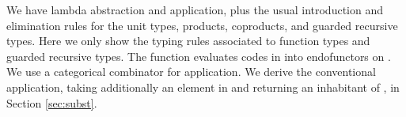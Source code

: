 \begin{AgdaAlign}
We have lambda abstraction and application, plus the usual
introduction and elimination rules for the unit types, products, 
coproducts, and guarded recursive types. Here we only show the typing rules associated to function types and guarded recursive types.
The function  evaluates codes in   into endofunctors on  .
We use a categorical combinator  for application.
We derive the conventional application, taking additionally an element
in    and returning an inhabitant of   , in Section \ref{sec:subst}.
\begin{code}%
%
\>[4]\AgdaSpace{}%
\AgdaSymbol{:}\AgdaSpace{}%
\AgdaSpace{}%
\AgdaSymbol{\{}\AgdaSymbol{\}}\AgdaSpace{}%
\AgdaSymbol{\{}\AgdaSpace{}%
\AgdaSymbol{:}\AgdaSpace{}%
\AgdaSpace{}%
\AgdaSymbol{\}}\AgdaSpace{}%
\AgdaSymbol{\{}\AgdaSpace{}%
\AgdaSpace{}%
\AgdaSymbol{:}\AgdaSpace{}%
\AgdaSpace{}%
\AgdaSymbol{\}}\AgdaSpace{}%
\AgdaSpace{}%
\AgdaSpace{}%
\AgdaSymbol{(}\AgdaSpace{}%
\AgdaOperator{\AgdaInductiveConstructor{,}}\AgdaSpace{}%
\AgdaSymbol{)}\AgdaSpace{}%
\AgdaSpace{}%
\AgdaSpace{}%
\AgdaSpace{}%
\AgdaSpace{}%
\AgdaSymbol{(}\AgdaSpace{}%
\AgdaSpace{}%
\AgdaSymbol{)}\<%
\\
%
\>[4]\AgdaSpace{}%
\AgdaSymbol{:}\AgdaSpace{}%
\AgdaSpace{}%
\AgdaSymbol{\{}\AgdaSymbol{\}}\AgdaSpace{}%
\AgdaSymbol{\{}\AgdaSpace{}%
\AgdaSymbol{:}\AgdaSpace{}%
\AgdaSpace{}%
\AgdaSymbol{\}}\AgdaSpace{}%
\AgdaSymbol{\{}\AgdaSpace{}%
\AgdaSpace{}%
\AgdaSymbol{:}\AgdaSpace{}%
\AgdaSpace{}%
\AgdaSymbol{\}}\AgdaSpace{}%
\AgdaSpace{}%
\AgdaSpace{}%
\AgdaSpace{}%
\AgdaSymbol{(}\AgdaSpace{}%
\AgdaSpace{}%
\AgdaSymbol{)}\AgdaSpace{}%
\AgdaSpace{}%
\AgdaSpace{}%
\AgdaSymbol{(}\AgdaSpace{}%
\AgdaOperator{\AgdaInductiveConstructor{,}}\AgdaSpace{}%
\AgdaSymbol{)}\AgdaSpace{}%
\<%
\\
%
\>[4]\AgdaSpace{}%

\end{code}
\end{AgdaAlign}
